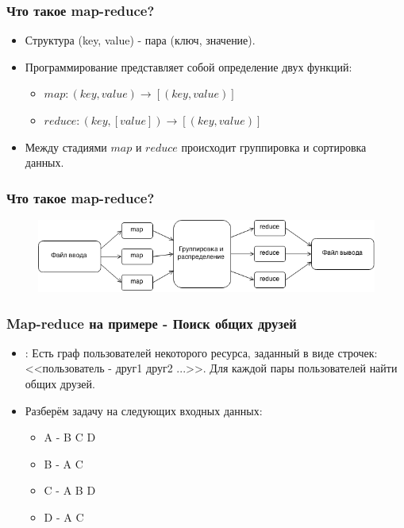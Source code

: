 \documentclass[utf8]{beamer}
\begin{document}
    \begin{frame}
    \frametitle{Что такое map-reduce?}
        \begin{itemize}
            \item Структура (key, value) - пара (ключ, значение).
            \item Программирование представляет собой определение двух функций:
            \begin{itemize}
                \item $map: (key, value)\rightarrow[(key, value)]$
                \item $reduce: (key, [value])\rightarrow[(key, value)]$
            \end{itemize}
            \item Между стадиями $map$ и $reduce$ происходит группировка и сортировка данных.
            
        \end{itemize} 
    \end{frame}

    \begin{frame}
    \frametitle{Что такое map-reduce?}
        \begin{figure}[h!]
            \centering
            \includegraphics[scale=0.4]{mapreduce.png}
        \end{figure}        
    \end{frame}

    \begin{frame}
    \frametitle{Map-reduce на примере - Поиск общих друзей}
        \begin{itemize}
            \item {:} Есть граф пользователей некоторого ресурса, заданный в виде строчек: <<пользователь - друг1 друг2 ...>>. Для каждой пары пользователей найти общих друзей.
            \item Разберём задачу на следующих входных данных:
                \begin{itemize}
                    \item A - B C D
                    \item B - A C
                    \item C - A B D
                    \item D - A C
                \end{itemize}          
        \end{itemize} 
    \end{frame}
\end{document}
